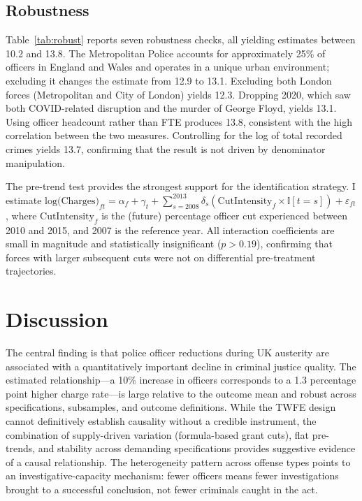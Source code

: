 \documentclass[12pt]{article}
\newcommand{\ind}{\mathbb{I}}
\begin{document}
\subsection{Robustness}



Table~\ref{tab:robust} reports seven robustness checks, all yielding estimates between 10.2 and 13.8. The Metropolitan Police accounts for approximately 25\% of officers in England and Wales and operates in a unique urban environment; excluding it changes the estimate from 12.9 to 13.1. Excluding both London forces (Metropolitan and City of London) yields 12.3. Dropping 2020, which saw both COVID-related disruption and the murder of George Floyd, yields 13.1. Using officer headcount rather than FTE produces 13.8, consistent with the high correlation between the two measures. Controlling for the log of total recorded crimes yields 13.7, confirming that the result is not driven by denominator manipulation.

The pre-trend test provides the strongest support for the identification strategy. I estimate $\text{log(Charges)}_{ft} = \alpha_f + \gamma_t + \sum_{s=2008}^{2013} \delta_s (\text{CutIntensity}_f \times \ind[t = s]) + \varepsilon_{ft}$, where $\text{CutIntensity}_f$ is the (future) percentage officer cut experienced between 2010 and 2015, and 2007 is the reference year. All interaction coefficients are small in magnitude and statistically insignificant ($p > 0.19$), confirming that forces with larger subsequent cuts were not on differential pre-treatment trajectories.


\section{Discussion}

The central finding is that police officer reductions during UK austerity are associated with a quantitatively important decline in criminal justice quality. The estimated relationship---a 10\% increase in officers corresponds to a 1.3 percentage point higher charge rate---is large relative to the outcome mean and robust across specifications, subsamples, and outcome definitions. While the TWFE design cannot definitively establish causality without a credible instrument, the combination of supply-driven variation (formula-based grant cuts), flat pre-trends, and stability across demanding specifications provides suggestive evidence of a causal relationship. The heterogeneity pattern across offense types points to an investigative-capacity mechanism: fewer officers means fewer investigations brought to a successful conclusion, not fewer criminals caught in the act.
\end{document}
